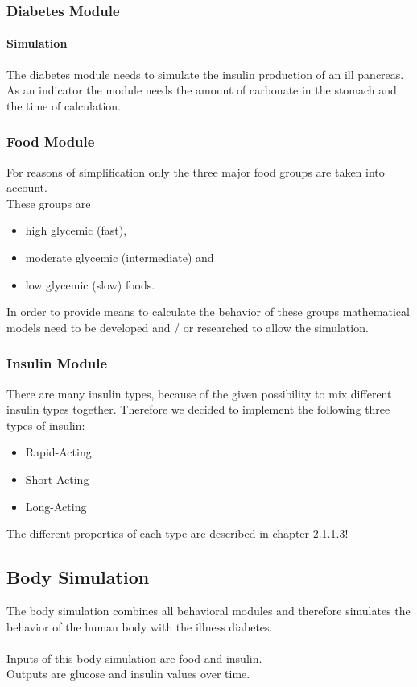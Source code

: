 \documentclass[pdflatex,a4paper,11pt,english]{scrreprt}
\begin{document}
\subsubsection{Diabetes Module}
\paragraph{Simulation} 
The diabetes module needs to simulate the insulin production of an ill pancreas. 
As an indicator the module needs the amount of carbonate in the stomach and the time of calculation.

\subsubsection{Food Module}
For reasons of simplification only the three major food groups are taken into
account.\\
These groups are 
\begin{itemize}
  \item high glycemic (fast),
  \item moderate glycemic (intermediate) and
  \item low glycemic (slow) foods.
\end{itemize}
In order to provide means to calculate the behavior of these groups
mathematical models need to be developed and / or researched to allow the
simulation.

\subsubsection{Insulin Module}
There are many insulin types, because of the given possibility to mix different 
insulin types together. Therefore we decided to implement the following three types of insulin:

\begin{itemize}
   \item Rapid-Acting
   \item Short-Acting
   \item Long-Acting
\end{itemize}

The different properties of each type are described in chapter 2.1.1.3!

\subsection{Body Simulation}
The body simulation combines all behavioral modules and therefore simulates the
behavior of the human body with the illness diabetes.\\ \\
Inputs of this body simulation are food and insulin. \\
Outputs are glucose and insulin values over time. \\ \\
\end{document}
